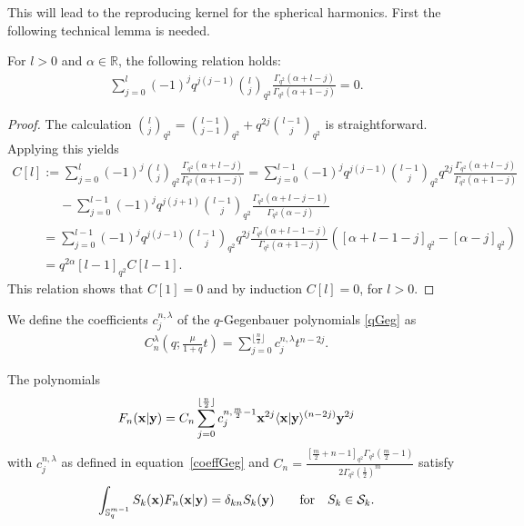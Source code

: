 \documentclass[pdftex]{sigma}
\newcommand{\mR}{\mathbb{R}}
\newcommand{\mS}{\mathbb{S}}
\newcommand{\cS}{\mathcal{S}}
\numberwithin{equation}{section}
\begin{document}
This will lead to the reproducing kernel for the spherical harmonics. First the following technical lemma is needed.
\begin{lemma}
\label{lemtechgamma}
For $l>0$ and $\alpha\in\mR$, the following relation holds:
\begin{gather*}
\sum_{j=0}^l(-1)^jq^{j(j-1)}\binom{l}{j}_{q^2}\frac{\Gamma_{q^2}(\alpha+l-j)}{\Gamma_{q^2}(\alpha+1-j)} = 0.
\end{gather*}
\end{lemma}
\begin{proof}
The calculation $\binom{l}{j}_{q^2}=\binom{l-1}{j-1}_{q^2}+q^{2j}\binom{l-1}{j}_{q^2}$ is straightforward. Applying this yields
\begin{gather*}
 C[l]:=\sum_{j=0}^l(-1)^j\binom{l}{j}_{q^2}\frac{\Gamma_{q^2}(\alpha+l-j)}{\Gamma_{q^2}(\alpha+1-j)}  = \sum_{j=0}^{l-1}(-1)^jq^{j(j-1)}\binom{l-1}{j}_{q^2}q^{2j}\frac{\Gamma_{q^2}(\alpha+l-j)}{\Gamma_{q^2}(\alpha+1-j)}\\
\phantom{C[l]=}{}
-\sum_{j=0}^{l-1}(-1)^jq^{j(j+1)}\binom{l-1}{j}_{q^2}\frac{\Gamma_{q^2}(\alpha+l-j-1)}{\Gamma_{q^2}(\alpha-j)}\\
\phantom{C[l]}{}
 = \sum_{j=0}^{l-1}(-1)^jq^{j(j-1)}\binom{l-1}{j}_{q^2}q^{2j}\frac{\Gamma_{q^2}(\alpha+l-1-j)}{\Gamma_{q^2}(\alpha+1-j)}
 \left([\alpha+l-1-j]_{q^2}-[\alpha-j]_{q^2}\right)\\
\phantom{C[l]}{}
= q^{2\alpha}[l-1]_{q^2}C[l-1].
\end{gather*}
This relation shows that $C[1]=0$ and by induction $C[l]=0$, for $l>0$.
\end{proof}

We def\/ine the coef\/f\/icients $c_j^{n,\lambda}$ of the $q$-Gegenbauer polynomials \eqref{qGeg} as
\begin{gather}
\label{coeffGeg}
C^\lambda_n\left(q;\frac{\mu}{1+q}t\right) = \sum_{j=0}^{\lfloor \frac{n}{2}\rfloor}c^{n,\lambda}_jt^{n-2j}.
\end{gather}

\begin{theorem}
The polynomials
\begin{gather*}
F_n(\bold{x}|\bold{y}) = C_n\sum_{j=0}^{\lfloor \frac{n}{2}\rfloor}c^{n,\frac{m}{2}-1}_j\bold{x}^{2j}\langle\bold{x}|\bold{y}\rangle^{(n-2j)}\bold{y}^{2j}
\end{gather*}
with $c^{n,\lambda}_j$ as defined in equation~\eqref{coeffGeg} and $C_n=\frac{[\frac{m}{2}+n-1]_{q^2}\Gamma_{q^2}(\frac{m}{2}-1)}{2\Gamma_{q^2}(\frac{1}{2})^m}$ satisfy
\begin{gather}
\label{repKern}
\int_{\mS^{m-1}_q}S_k(\bold{x})F_n(\bold{x}|\bold{y}) = \delta_{kn}S_k(\bold{y})\qquad \mbox{for} \quad S_k\in\cS_k.
\end{gather}
\end{theorem}
\end{document}
